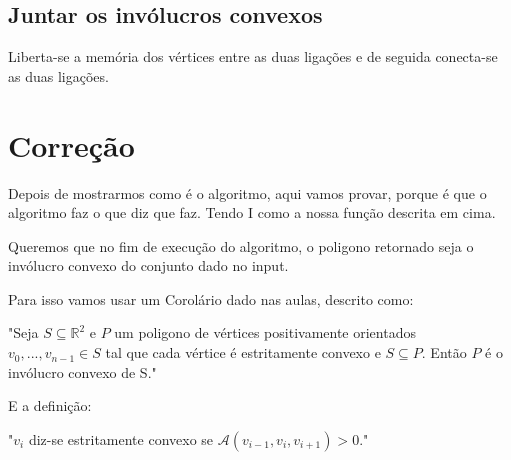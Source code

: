 \documentclass[11pt]{article}
\begin{document}
\subsection{ Juntar os invólucros convexos } 
Liberta-se a memória dos vértices entre as duas ligações e de seguida 
conecta-se as duas ligações.


\section{Correção}
Depois de mostrarmos como é o algoritmo,
aqui vamos provar, porque é que o algoritmo faz o que diz que faz.
Tendo I como a nossa função descrita em cima.\\
\par
Queremos que no fim de execução do algoritmo, o poligono
retornado seja o invólucro convexo do conjunto dado 
no input.\par
Para isso vamos usar um Corolário dado nas aulas, descrito como:

\begin{center}
    "Seja $S \subseteq \mathbb{R}^2$ e $P$ um poligono de vértices 
    positivamente orientados $v_0,...,v_{n-1} \in S$ tal que cada
    vértice é estritamente convexo e $S \subseteq P$. Então $P$ é
    o invólucro convexo de S."
\end{center}

E a definição:

\begin{center}
    "$v_i$ diz-se estritamente convexo se $\mathcal{A}(v_{i-1},v_i,v_{i+1}) > 0$."
\end{center}
\end{document}
